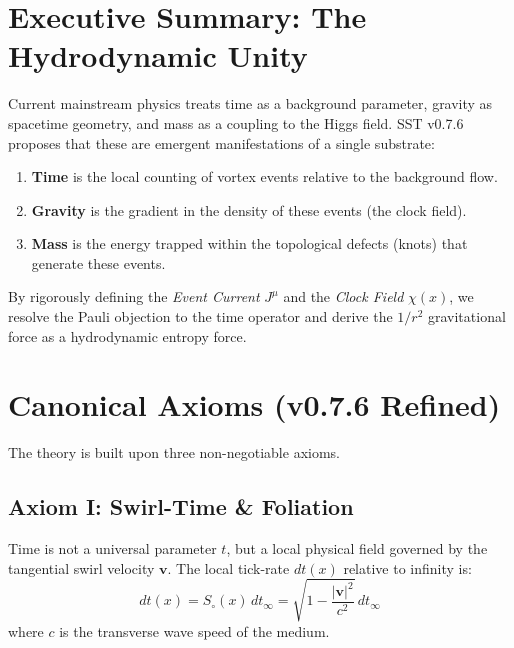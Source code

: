 \documentclass[10pt]{article}
\begin{document}
    \section{Executive Summary: The Hydrodynamic Unity}

        Current mainstream physics treats time as a background parameter, gravity as spacetime geometry, and mass as a coupling to the Higgs field. SST v0.7.6 proposes that these are emergent manifestations of a single substrate:

        \begin{enumerate}
            \item \textbf{Time} is the local counting of vortex events relative to the background flow.
            \item \textbf{Gravity} is the gradient in the density of these events (the clock field).
            \item \textbf{Mass} is the energy trapped within the topological defects (knots) that generate these events.
        \end{enumerate}

        By rigorously defining the \textit{Event Current} $J^\mu$ and the \textit{Clock Field} $\chi(x)$, we resolve the Pauli objection to the time operator and derive the $1/r^2$ gravitational force as a hydrodynamic entropy force.

    \section{Canonical Axioms (v0.7.6 Refined)}

        The theory is built upon three non-negotiable axioms.

        \subsection*{Axiom I: Swirl-Time \& Foliation}
            Time is not a universal parameter $t$, but a local physical field governed by the tangential swirl velocity $\mathbf{v}$. The local tick-rate $dt(x)$ relative to infinity is:
            \begin{equation}
                dt(x) = S_\circ(x) \, dt_\infty = \sqrt{1 - \frac{|\mathbf{v}|^2}{c^2}} \, dt_\infty
            \end{equation}
            where $c$ is the transverse wave speed of the medium.
\end{document}
